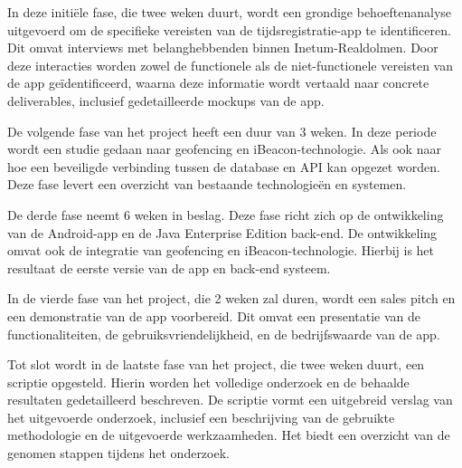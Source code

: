 


In deze initiële fase, die twee weken duurt, wordt een grondige behoeftenanalyse uitgevoerd om de specifieke vereisten van de tijdsregistratie-app te identificeren. Dit omvat interviews met belanghebbenden binnen Inetum-Realdolmen. Door deze interacties worden zowel de functionele als de niet-functionele vereisten van de app geïdentificeerd, waarna deze informatie wordt vertaald naar concrete deliverables, inclusief gedetailleerde mockups van de app.

De volgende fase van het project heeft een duur van 3 weken. In deze periode wordt een studie gedaan naar geofencing en iBeacon-technologie. Als ook naar hoe een beveiligde verbinding tussen de database en API kan opgezet worden. Deze fase levert een overzicht van bestaande technologieën en systemen.

De derde fase neemt 6 weken in beslag. Deze fase richt zich op de ontwikkeling van de Android-app en de Java Enterprise Edition back-end. De ontwikkeling omvat ook de integratie van geofencing en iBeacon-technologie. Hierbij is het resultaat de eerste versie van de app en back-end systeem.

In de vierde fase van het project, die 2 weken zal duren, wordt een sales pitch en een demonstratie van de app voorbereid. Dit omvat een presentatie van de functionaliteiten, de gebruiksvriendelijkheid, en de bedrijfswaarde van de app.

Tot slot wordt in de laatste fase van het project, die twee weken duurt, een scriptie opgesteld. Hierin worden het volledige onderzoek en de behaalde resultaten gedetailleerd beschreven. De scriptie vormt een uitgebreid verslag van het uitgevoerde onderzoek, inclusief een beschrijving van de gebruikte methodologie en de uitgevoerde werkzaamheden. Het biedt een overzicht van de genomen stappen tijdens het onderzoek.



